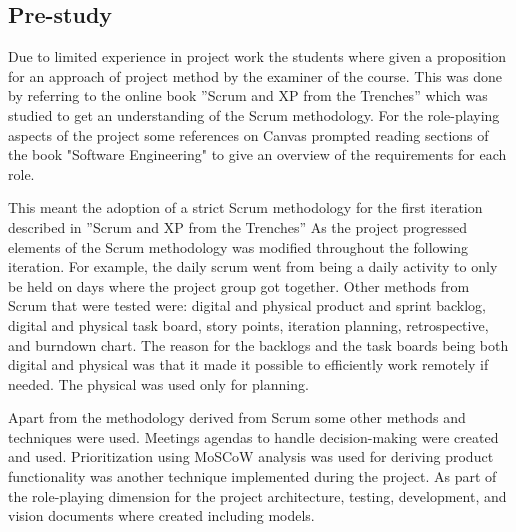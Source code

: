 \subsection{Pre-study}
Due to limited experience in project work the students where given a proposition for an approach of project method by the examiner of the course. This was done by referring to the online book ”Scrum and XP from the Trenches” \cite{kniberg_scrum_2015} which was studied to get an understanding of the Scrum methodology. For the role-playing aspects of the project some references on Canvas prompted reading sections of the book "Software Engineering" \cite{ian_sommerville_software_nodate} to give an overview of the requirements for each role. 

This meant the adoption of a strict Scrum methodology for the first iteration described in ”Scrum and XP from the Trenches”  \cite{kniberg_scrum_2015} As the project progressed elements of the Scrum methodology was modified throughout the following iteration. For example, the daily scrum went from being a daily activity to only be held on days where the project group got together. Other methods from Scrum that were tested were: digital and physical product and sprint backlog, digital and physical task board, story points, iteration planning, retrospective, and burndown chart. The reason for the backlogs and the task boards being both digital and physical was that it made it possible to efficiently work remotely if needed. The physical was used only for planning.

Apart from the methodology derived from Scrum some other methods and techniques were used. Meetings agendas to handle decision-making were created and used. Prioritization using MoSCoW analysis was used for deriving product functionality was another technique implemented during the project. As part of the role-playing dimension for the project architecture, testing, development, and vision documents where created including models.


